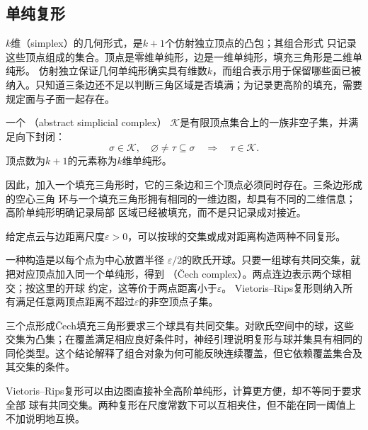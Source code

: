 \subsection{单纯复形}

$k$维（simplex）的几何形式，是$k+1$个仿射独立顶点的凸包；其组合形式
只记录这些顶点组成的集合。顶点是零维单纯形，边是一维单纯形，填充三角形是二维单纯形。
仿射独立保证几何单纯形确实具有维数$k$，而组合表示用于保留哪些面已被纳入。只知道三条边还不足以判断三角区域是否填满；为记录更高阶的填充，需要规定面与子面一起存在。

\begin{definition}[抽象单纯复形]
\label{def:geometry-simplicial-complex}
一个
（abstract simplicial complex）
$\mathcal{K}$是有限顶点集合上的一族非空子集，并满足向下封闭：
\begin{equation}
  \sigma\in\mathcal{K},\quad
  \varnothing\neq\tau\subseteq\sigma
  \quad\Longrightarrow\quad
  \tau\in\mathcal{K}.
  \label{eq:geometry-simplicial-complex-closure}
\end{equation}
顶点数为$k+1$的元素称为$k$维单纯形。
\end{definition}
因此，加入一个填充三角形时，它的三条边和三个顶点必须同时存在。三条边形成的空心三角
环与一个填充三角形拥有相同的一维边图，却具有不同的二维信息；高阶单纯形明确记录局部
区域已经被填充，而不是只记录成对接近。

给定点云与边距离尺度$\varepsilon>0$，可以按球的交集或成对距离构造两种不同复形。

\begin{definition}
\label{def:geometry-cech-rips-complexes}
一种构造是以每个点为中心放置半径
$\varepsilon/2$的欧氏开球。只要一组球有共同交集，就把对应顶点加入同一个单纯形，得到
（Čech complex）。两点连边表示两个球相交；按这里的开球
约定，这等价于两点距离小于$\varepsilon$。
Vietoris--Rips复形则纳入所有满足任意两顶点距离不超过$\varepsilon$的非空顶点子集。
\end{definition}

三个点形成Čech填充三角形要求三个球具有共同交集。对欧氏空间中的球，这些交集为凸集；在覆盖满足相应良好条件时，神经引理说明复形与球并集具有相同的同伦类型。这个结论解释了组合对象为何可能反映连续覆盖，但它依赖覆盖集合及其交集的条件。

Vietoris--Rips复形可以由边图直接补全高阶单纯形，计算更方便，却不等同于要求全部
球有共同交集。两种复形在尺度常数下可以互相夹住，但不能在同一阈值上不加说明地互换。


